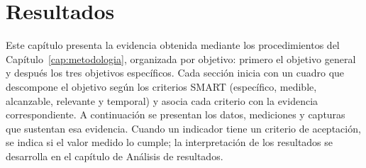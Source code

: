 %
%
%
\ifdefined\modoensamble
\else
	
\fi

\chapter{Resultados}
\label{cap:resultados}

Este capítulo presenta la evidencia obtenida mediante los procedimientos del
Capítulo~\ref{cap:metodologia}, organizada por objetivo: primero el objetivo general y después
los tres objetivos específicos. Cada sección inicia con un cuadro que descompone el objetivo según
los criterios SMART \cite{doran1981smart} (específico, medible, alcanzable, relevante y temporal) y asocia cada criterio
con la evidencia correspondiente. A continuación se presentan los datos, mediciones y capturas que
sustentan esa evidencia. Cuando un indicador tiene un criterio de aceptación, se indica si el valor
medido lo cumple; la interpretación de los resultados se desarrolla en el capítulo de Análisis de resultados.

